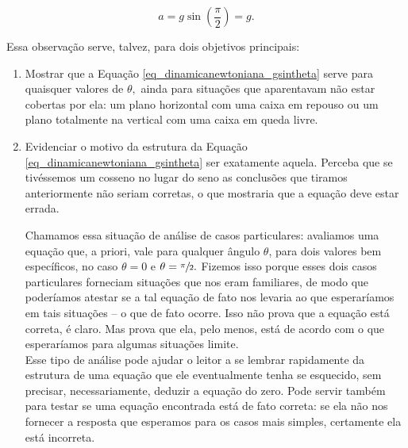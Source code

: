 $$ a = g \sin \left(\dfrac{\pi}{2}\right) = g.$$



Essa observação serve, talvez, para dois objetivos principais:

\begin{enumerate}
    \item [(i)] Mostrar que a Equação \eqref{eq_dinamicanewtoniana_gsintheta} serve para quaisquer valores de $\theta,$ ainda para situações que aparentavam não estar cobertas por ela: um plano horizontal com uma caixa em repouso ou um plano totalmente na vertical com uma caixa em queda livre.
    \item [(ii)] Evidenciar o motivo da estrutura da Equação \eqref{eq_dinamicanewtoniana_gsintheta} ser exatamente aquela. Perceba que se tivéssemos um cosseno no lugar do seno as conclusões que tiramos anteriormente não seriam corretas, o que mostraria que a equação deve estar errada. 
    
    Chamamos essa situação de análise de casos particulares: avaliamos uma equação que, a priori, vale para qualquer ângulo $\theta$, para dois valores bem específicos, no caso $\theta=0$ e $\theta = \sfrac{\pi}{2}.$ Fizemos isso porque esses dois casos particulares forneciam situações que nos eram familiares, de modo que poderíamos atestar se a tal equação de fato nos levaria ao que esperaríamos em tais situações -- o que de fato ocorre. Isso não prova que a equação está correta, é claro. Mas prova que ela, pelo menos, está de acordo com o que esperaríamos para algumas situações limite. \\
    Esse tipo de análise pode ajudar o leitor a se lembrar rapidamente da estrutura de uma equação que ele eventualmente tenha se esquecido, sem precisar, necessariamente, deduzir a equação do zero. Pode servir também para testar se uma equação encontrada está de fato correta: se ela não nos fornecer a resposta que esperamos para os casos mais simples, certamente ela está incorreta.
 \end{enumerate}

\vspace{0.3cm}

